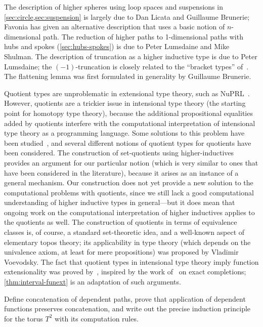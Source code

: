 The description of higher spheres using loop spaces and suspensions in \autoref{sec:circle,sec:suspension} is largely due to Dan Licata and Guillaume Brunerie; Favonia has given an alternative description that uses a basic notion of $n$-dimensional path.
The reduction of higher paths to 1-dimensional paths with hubs and spokes (\autoref{sec:hubs-spokes}) is due to Peter Lumsdaine and Mike Shulman.
The description of truncation as a higher inductive type is due to Peter Lumsdaine; the $(-1)$-truncation is closely related to the ``bracket types'' of~\cite{ab:bracket-types}.
The flattening lemma was first formulated in generality by Guillaume Brunerie.

Quotient types are unproblematic in extensional type theory, such as NuPRL~\cite{constable+86nuprl-book}.  However, quotients are a trickier issue in intensional type theory (the starting point for homotopy type theory), because the additional propositional equalities added by quotients interfere with the computational interpretation of intensional type theory as a programming language. Some solutions to this problem have been studied~\cite{hofmann:thesis,altenkirch99extensional,altenkirch+07ott}, and several different notions of quotient types for quotients have been considered.  The construction of set-quotients using higher-inductives provides an argument for our particular notion (which is very similar to ones that have been considered in the literature), because it arises as an instance of a general mechanism.  Our construction does not yet provide a new solution to the computational problems with quotients,
since we still lack a good computational understanding of
higher inductive types in general---but it does mean that ongoing work on the computational interpretation of higher inductives applies to the quotients as well.  The construction of quotients in terms of equivalence classes is, of
course, a standard set-theoretic idea, and a well-known aspect of
elementary topos theory; its applicability in type theory (which depends
on the univalence axiom, at least for mere propositions) was proposed by
Vladimir Voevodsky.  The fact that quotient types in intensional type theory imply function extensionality was proved by~\cite{hofmann:thesis}, inspired by the work of~\cite{carboni} on exact completions; \autoref{thm:interval-funext} is an adaptation of such arguments.

\sectionExercises

\begin{ex}\label{ex:torus}
  Define concatenation of dependent paths, prove that application of dependent functions preserves concatenation, and write out the precise induction principle for the torus $T^2$ with its computation rules.
\end{ex}

